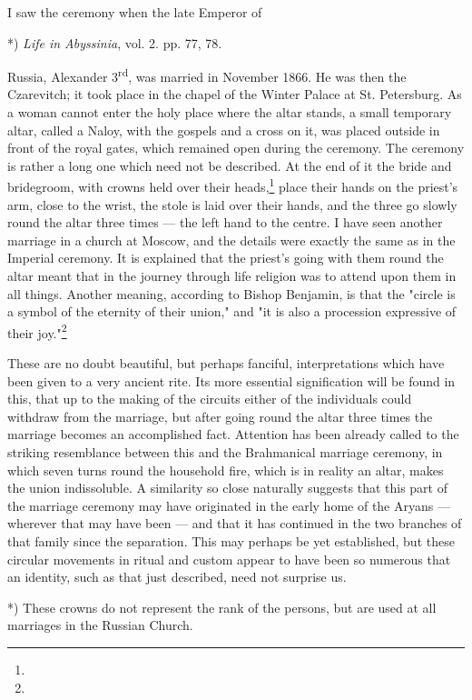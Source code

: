 \documentclass[a4paper, 11pt, oneside, polutonikogreek, english]{article}
\begin{document}
I saw the ceremony when the late Emperor of 

*) \emph{Life in Abyssinia}, vol. 2. pp. 77, 78.

Russia, Alexander 3\textsuperscript{rd}, was married in November 1866. He was then the Czarevitch; it took place in the chapel of the Winter Palace at St. Petersburg. As a woman cannot enter the holy place where the altar stands, a small temporary altar, called a Naloy, with the gospels and a cross on it, was placed outside in front of the royal gates, which remained open during the ceremony. The ceremony is rather a long one which need not be described. At the end of it the bride and bridegroom, with crowns held over their heads,\footnote{} place their hands on the priest's arm, close to the wrist, the stole is laid over their hands, and the three go slowly round the altar three times --- the left hand to the centre. I have seen another marriage in a church at Moscow, and the details were exactly the same as in the Imperial ceremony. It is explained that the priest's going with them round the altar meant that in the journey through life religion was to attend upon them in all things. Another meaning, according to Bishop Benjamin, is that the "circle is a symbol of the eternity of their union," and "it is also a procession expressive of their joy."\footnote{}

These are no doubt beautiful, but perhaps fanciful, interpretations which have been given to a very ancient rite. Its more essential signification will be found in this, that up to the making of the circuits either of the individuals could withdraw from the marriage, but after going round the altar three times the marriage becomes an accomplished fact. Attention has been already called to the striking resemblance between this and the Brahmanical marriage ceremony, in which seven turns round the household fire, which is in reality an altar, makes the union indissoluble. A similarity so close naturally suggests that this part of the marriage ceremony may have originated in the early home of the Aryans --- wherever that may have been --- and that it has continued in the two branches of that family since the separation. This may perhaps be yet established, but these circular movements in ritual and custom appear to have been so numerous that an identity, such as that just described, need not surprise us.

*) These crowns do not represent the rank of the persons, but are used at all marriages in the Russian Church.
\end{document}
